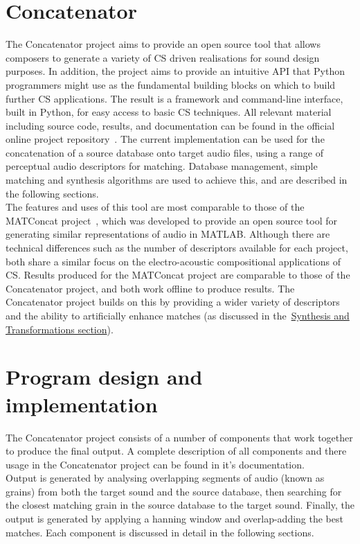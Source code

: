 \documentclass{scrartcl}
\begin{document}
    \section*{Concatenator}
    The Concatenator project aims to provide an open source tool that allows
    composers to generate a variety of CS driven realisations for sound design
    purposes.  In addition, the project aims to provide an intuitive API that
    Python programmers might use as the fundamental building blocks on which to
    build further CS applications.  The result is a framework and command-line
    interface, built in Python, for easy access to basic CS techniques. All
    relevant material including source code, results, and documentation can be
    found in the official online project repository~\parencite{perry2016a}.
    The current implementation can be used for the concatenation of a source
    database onto target audio files, using a range of perceptual audio
    descriptors for matching.  Database management, simple matching and
    synthesis algorithms are used to achieve this, and are described in the
    following sections. \\

    The features and uses of this tool are most comparable to those of the
    MATConcat project~\parencite{sturm2004}, which was developed to provide an
    open source tool for generating similar representations of audio in MATLAB.
    Although there are technical differences such as the number of descriptors
    available for each project, both share a similar focus on the
    electro-acoustic compositional applications of CS. Results produced for the
    MATConcat project are comparable to those of the Concatenator project, and
    both work offline to produce results. The Concatenator project builds on
    this by providing a wider variety of descriptors and the ability to
    artificially enhance matches (as discussed in the~\hyperref[sat]{Synthesis
    and Transformations section}).

    \section*{Program design and implementation}
    The Concatenator project consists of a number of components that work
    together to produce the final output. A complete description of all
    components and there usage in the Concatenator project can be found in it's
    documentation.\\

    Output is generated by analysing overlapping segments of audio (known as
    grains) from both the target sound and the source database, then searching
    for the closest matching grain in the source database to the target sound.
    Finally, the output is generated by applying a hanning window and
    overlap-adding the best matches. Each component is discussed in detail
    in the following sections.\\
\end{document}
